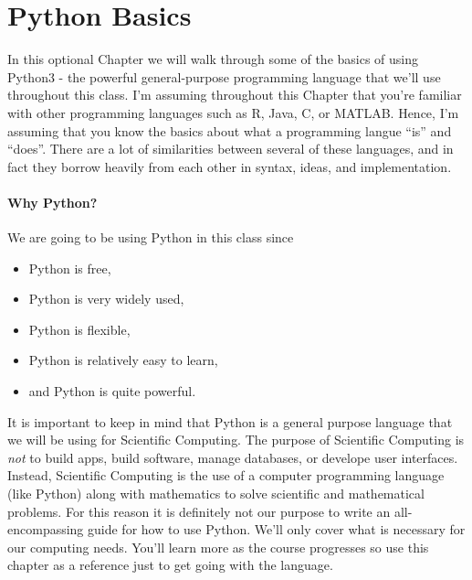 \chapter{Python Basics}\label{app:coding}


In this optional Chapter we will walk through some of the basics of using Python3 - the
powerful general-purpose programming language that we'll use throughout this class.  I'm
assuming throughout this Chapter that you're familiar with other programming languages
such as R, Java, C, or MATLAB.  Hence, I'm assuming that you know the basics about what a
programming langue ``is'' and ``does''.  There are a lot of similarities between several
of these languages, and in fact they borrow heavily from each other in syntax, ideas, and
implementation.

\subsubsection*{Why Python?}
We are going to be using Python in this class since

\begin{itemize}
    \item Python is free,
    \item Python is very widely used,
    \item Python is flexible,
    \item Python is relatively easy to learn,
    \item and Python is quite powerful.
\end{itemize}

It is important to keep in mind that Python is a general purpose language that we will be
using for Scientific Computing.  The purpose of Scientific Computing is {\it not} to build
apps, build software, manage databases, or develope user interfaces.  Instead, Scientific
Computing is the use of a computer programming language (like Python) along with
mathematics to solve scientific and mathematical problems.  For this reason it is
definitely not our purpose to write an all-encompassing guide for how to use Python.
We'll only cover what is necessary for our computing needs.  You'll learn more as the
course progresses so use this chapter as a reference just to get going with the language.

